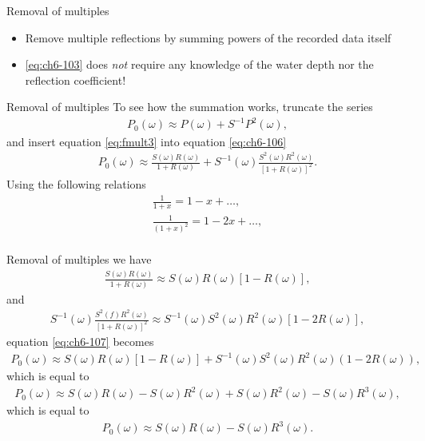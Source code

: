 \documentclass[xcolor=dvipsnames,notes]{beamer}
\begin{document}
%
%
\begin{frame}{Removal of multiples}
\begin{itemize}
  \item Remove multiple reflections by summing powers of the recorded data itself

  \item \eqref{eq:ch6-103} does {\em not} require any knowledge of the water depth nor the
        reflection coefficient!
\end{itemize}
\end{frame}
%
%
\begin{frame}{Removal of multiples}
To see how the summation works, truncate the series 
%
\begin{eqnarray}
  P_0(\omega) \approx P(\omega)+S^{-1}P^2(\omega),
                                \label{eq:ch6-106}
\end{eqnarray}
%
and insert equation \eqref{eq:fmult3} into equation \eqref{eq:ch6-106}
%
\begin{eqnarray}
  P_0(\omega) \approx \frac{S(\omega)R(\omega)}{1+R(\omega)} + 
  S^{-1}(\omega) \frac{S^2(\omega)R^2(\omega)}{[1+R(\omega)]^2}.
                                \label{eq:ch6-107}
\end{eqnarray}
%
Using the following relations
%
\begin{eqnarray}
 \frac{1}{1+x} = 1-x+\ldots,\nonumber\\
 \frac{1}{{(1+x)}^2} = 1-2x+\ldots,\nonumber\\
\end{eqnarray}
\end{frame}
%
%
\begin{frame}{Removal of multiples}
we have
%
\begin{eqnarray}
\frac{S(\omega)R(\omega)}{1+R(\omega)} \approx S(\omega)R(\omega)\left[1-R(\omega)\right],
\end{eqnarray}
and
%
\begin{eqnarray}
S^{-1}(\omega) \frac{S^2(f)R^2(\omega)}{[1+R(\omega)]^2} 
         \approx S^{-1}(\omega) S^2(\omega)R^2(\omega){[1-2R(\omega)]},
\end{eqnarray}
%
equation \eqref{eq:ch6-107} becomes
%
\begin{eqnarray}
  P_0(\omega) \approx S(\omega)R(\omega)\left[1-R(\omega)\right] 
               + S^{-1}(\omega) S^2(\omega)R^2(\omega){(1-2R(\omega))},
                                \label{eq:ch6-107b}
\end{eqnarray}
%
which is equal to
%
\begin{eqnarray}
  P_0(\omega) \approx S(\omega)R(\omega)-S(\omega)R^2(\omega) 
                   +S(\omega)R^2(\omega)-S(\omega)R^3(\omega),
                                \label{eq:ch6-108}
\end{eqnarray}
%
which is equal to
%
\begin{eqnarray}
  P_0(\omega) \approx S(\omega)R(\omega)-S(\omega)R^3(\omega).
                                \label{eq:ch6-109}
\end{eqnarray}
%
\end{frame}
\end{document}
